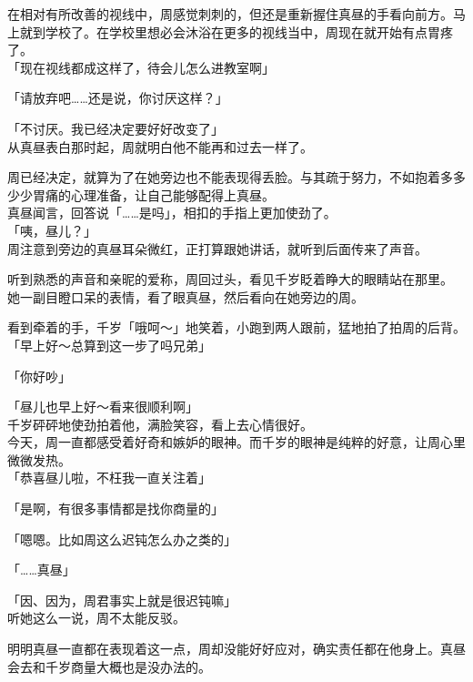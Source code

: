 在相对有所改善的视线中，周感觉刺刺的，但还是重新握住真昼的手看向前方。马上就到学校了。在学校里想必会沐浴在更多的视线当中，周现在就开始有点胃疼了。\\

「现在视线都成这样了，待会儿怎么进教室啊」

「请放弃吧……还是说，你讨厌这样？」

「不讨厌。我已经决定要好好改变了」\\

从真昼表白那时起，周就明白他不能再和过去一样了。

周已经决定，就算为了在她旁边也不能表现得丢脸。与其疏于努力，不如抱着多多少少胃痛的心理准备，让自己能够配得上真昼。\\

真昼闻言，回答说「……是吗」，相扣的手指上更加使劲了。\\

「咦，昼儿？」\\

周注意到旁边的真昼耳朵微红，正打算跟她讲话，就听到后面传来了声音。

听到熟悉的声音和亲昵的爱称，周回过头，看见千岁眨着睁大的眼睛站在那里。\\

她一副目瞪口呆的表情，看了眼真昼，然后看向在她旁边的周。

看到牵着的手，千岁「哦呵～」地笑着，小跑到两人跟前，猛地拍了拍周的后背。\\

「早上好～总算到这一步了吗兄弟」

「你好吵」

「昼儿也早上好～看来很顺利啊」\\

千岁砰砰地使劲拍着他，满脸笑容，看上去心情很好。\\

今天，周一直都感受着好奇和嫉妒的眼神。而千岁的眼神是纯粹的好意，让周心里微微发热。\\

「恭喜昼儿啦，不枉我一直关注着」

「是啊，有很多事情都是找你商量的」

「嗯嗯。比如周这么迟钝怎么办之类的」

「……真昼」

「因、因为，周君事实上就是很迟钝嘛」\\

听她这么一说，周不太能反驳。

明明真昼一直都在表现着这一点，周却没能好好应对，确实责任都在他身上。真昼会去和千岁商量大概也是没办法的。\\

